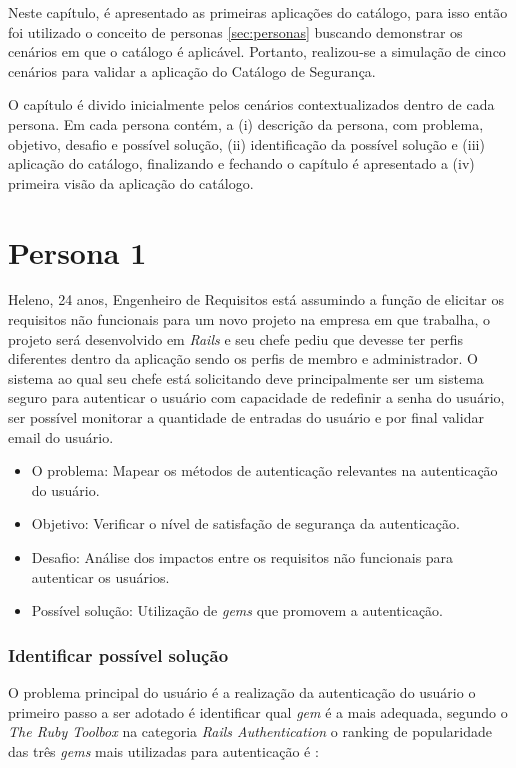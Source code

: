 Neste capítulo, é apresentado as primeiras aplicações do catálogo, para isso então foi utilizado o conceito de personas \ref{sec:personas} buscando demonstrar os cenários em que o catálogo é aplicável. Portanto, realizou-se a simulação de cinco cenários para validar a aplicação do Catálogo de Segurança. 

O capítulo é divido inicialmente pelos cenários contextualizados dentro de cada persona. Em cada persona contém, a (i) descrição da persona, com problema, objetivo, desafio e possível solução, (ii) identificação da possível solução e (iii) aplicação do catálogo, finalizando e fechando o capítulo é apresentado a (iv) primeira visão da aplicação do catálogo.  


\section{Persona 1}

Heleno, 24 anos, Engenheiro de Requisitos está assumindo a função de elicitar os requisitos não funcionais para um novo projeto na empresa em que trabalha, o projeto será desenvolvido em \textit{Rails} e seu chefe pediu que devesse ter perfis diferentes dentro da aplicação sendo os perfis de membro e administrador. O sistema ao qual seu chefe está solicitando deve principalmente ser um sistema seguro para autenticar o usuário com capacidade de redefinir a senha do usuário, ser possível monitorar a quantidade de entradas do usuário e por final validar email do usuário.

\begin{itemize}
	\item O problema: Mapear os métodos de autenticação relevantes na autenticação do usuário. 
	\item Objetivo: Verificar o nível de satisfação de segurança da autenticação. 
	\item Desafio: Análise dos impactos entre os requisitos não funcionais para autenticar os usuários.
	\item Possível solução: Utilização de \textit{gems} que promovem a autenticação.
\end{itemize}


\subsubsection{Identificar possível solução}

O problema principal do usuário é a realização da autenticação do usuário o primeiro passo a ser adotado é identificar qual \textit{gem} é a mais adequada, segundo o \textit{The Ruby Toolbox} na categoria \textit{Rails Authentication} o ranking de popularidade das três \textit{gems} mais utilizadas para autenticação é \cite{rubytoolbox}:

